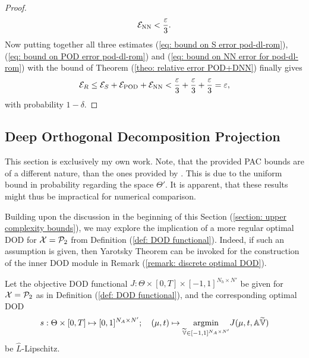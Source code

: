 \begin{proof}
    \begin{equation} \label{eq: bound on NN error for pod-dl-rom}
        \mathcal{E}_{\text{NN}} < \frac{\varepsilon}{3}.
    \end{equation}
    Now putting together all three estimates (\ref{eq: bound on S error pod-dl-rom}), 
    (\ref{eq: bound on POD error pod-dl-rom}) and (\ref{eq: bound on NN error for pod-dl-rom}) 
    with the bound of Theorem (\ref{theo: relative error POD+DNN}) finally gives
    \begin{equation*}
        \mathcal{E}_R \leq \mathcal{E}_{S} + \mathcal{E}_{\text{POD}} + \mathcal{E}_{\text{NN}} < 
        \frac{\varepsilon}{3} + \frac{\varepsilon}{3}
        + \frac{\varepsilon}{3} = \varepsilon,
    \end{equation*}
    with probability $1 - \delta$.
\end{proof}



\subsection{Deep Orthogonal Decomposition Projection}


This section is exclusively my own work. Note, that the provided PAC bounds are of a different
nature, than the ones provided by \cite{brivio2023}. This is due to the uniform bound in probability
regarding the space $\Theta'$. It is apparent, that these results might thus be impractical for numerical
comparison.

Building upon the discussion in the beginning of this Section (\ref{section: upper complexity bounds}), we
may explore the implication of a more regular optimal DOD for $\mathcal{X} = \mathcal{P}_2$ 
from Definition (\ref{def: DOD functional}).
Indeed, if such an assumption is given, then Yarotsky Theorem can be invoked for the
construction of the inner DOD module in Remark (\ref{remark: discrete optimal DOD}). 

\begin{assumption} \label{assumption additional lipschitz}
    Let the objective DOD functional $J: \Theta \times [0, T] \times [-1, 1]^{N_h \times N'}$ be given
    for $\mathcal{X} = \mathcal{P}_2$ as in Definition (\ref{def: DOD functional}), and the corresponding
    optimal DOD
    \begin{equation*}
        s: \Theta \times [0, T] \mapsto [0, 1]^{N_A \times N'}; \quad (\mu, t) \mapsto 
        \underset{{\widetilde{\mathbb{V}} \in [-1, 1]^{N_A \times N'}}}{\text{argmin}}  
        J(\mu, t, \mathbb{A} \widetilde{\mathbb{V}})
    \end{equation*}
    be $\hat{L}$-Lipschitz.
\end{assumption}

